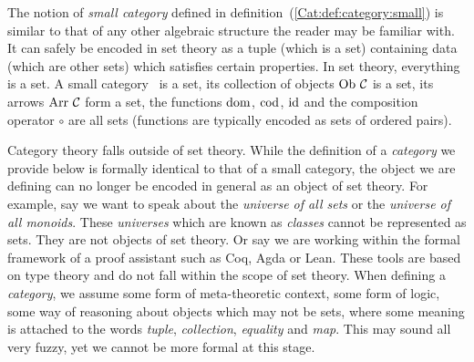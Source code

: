 The notion of {\em small category} defined in 
definition~(\ref{Cat:def:category:small}) is similar to that of any other 
algebraic structure the reader may be familiar with. It can safely be encoded 
in set theory as a tuple (which is a set) containing data (which are other 
sets) which satisfies certain properties. In set theory, everything is a 
set. A small category \Cat\ is a set, its collection of objects $\ob\ \Cat$ is 
a set, its arrows $\arr\ \Cat$ form a set, the functions $\mbox{\rm dom}$, $\mbox{\rm cod}$, $\mbox{\rm id}$ 
and the composition operator $\circ$ are all sets (functions are typically 
encoded as sets of ordered pairs). 

Category theory falls outside of set theory. While the definition of a
{\em category} we provide below is formally identical to that of a small
category, the object we are defining can no longer be encoded in general 
as an object of set theory. For example, say we want to speak about the 
{\em universe of all sets} or the {\em universe of all monoids}. These 
{\em universes} which are known as {\em classes} cannot be represented 
as sets. They are not objects of set theory. Or say we are working within
the formal framework of a proof assistant such as {\rm Coq}, {\rm Agda} or
{\rm Lean}. These tools are based on type theory and do not fall within
the scope of set theory. When defining a {\em category}, we assume some
form of meta-theoretic context, some form of logic, some way of reasoning
about objects which may not be sets, where some meaning is attached to the
words {\em tuple}, {\em collection}, {\em equality} and {\em map}. 
This may sound all very fuzzy, yet we cannot be more formal at this stage.

